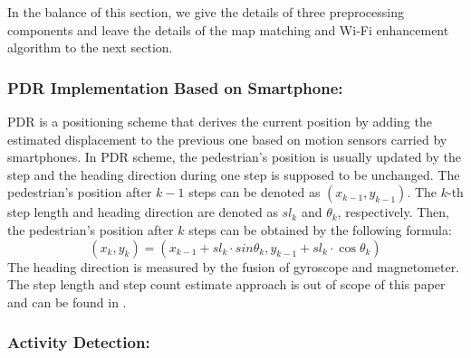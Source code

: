 \documentclass{llncs}
\begin{document}
In the balance of this section, we give the details of three preprocessing components and leave the details of the map matching and Wi-Fi enhancement algorithm to the next section.

\subsubsection{PDR Implementation Based on Smartphone:}

PDR is a positioning scheme that derives the current position by adding the estimated displacement to the previous one based on motion sensors carried by smartphones. In PDR scheme, the pedestrian's position is usually updated by the step and the heading direction during one step is supposed to be unchanged. The pedestrian's position after $k-1$ steps can be denoted as $(x_{k-1},y_{k-1})$. The $k$-th step length and heading direction are denoted as $sl_k$ and $\theta_k$, respectively. Then, the pedestrian's position after $k$ steps can be obtained by the following formula:
\begin{equation}
\label{equ_pdr}
({x_k},{y_k}) = ({x_{k - 1}} + s{l_k} \cdot sin{\theta _k},{y_{k - 1}} + s{l_k} \cdot \cos {\theta _k})
\end{equation}
The heading direction is measured by the fusion of gyroscope and magnetometer. The step length and step count estimate approach is out of scope of this paper and can be found in \cite{wang2012no}. 

\subsubsection{Activity Detection:}

\end{document}
